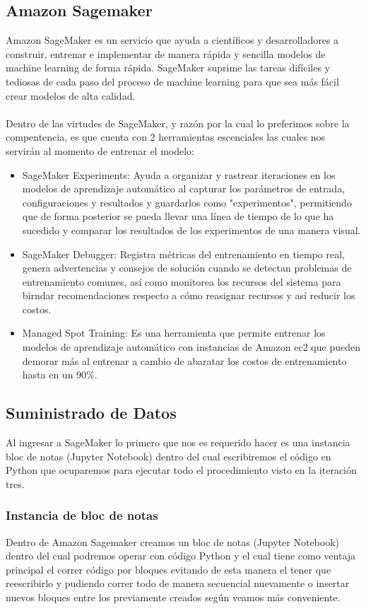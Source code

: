 \documentclass[12pt, a4paper, titlepage]{report}
\begin{document}
	\subsection{Amazon Sagemaker}
	Amazon SageMaker es un servicio que ayuda a científicos y desarrolladores a construir, entrenar e implementar de manera rápida y sencilla modelos de machine learning de forma rápida. SageMaker suprime las tareas difíciles y tediosas de cada paso del proceso de machine learning para que sea más fácil crear modelos de alta calidad.\\\\
	Dentro de las virtudes de SageMaker, y razón por la cual lo preferimos sobre la compentencia, es que cuenta con 2 herramientas escenciales las cuales nos servirán al momento de entrenar el modelo:
	\begin{itemize}
	\item SageMaker Experiments: Ayuda a organizar y rastrear iteraciones en los modelos de aprendizaje automático al capturar los parámetros de entrada, configuraciones y resultados y guardarlos como "experimentos", permitiendo que de forma posterior se pueda llevar una línea de tiempo de lo que ha sucedido y comparar los resultados de los experimentos de una manera visual.
	\item SageMaker Debugger: Registra métricas del entrenamiento en tiempo real, genera advertencias y consejos de solución cuando se detectan problemas de entrenamiento comunes, así como monitorea los recursos del sistema para birndar recomendaciones respecto a cómo reasignar recursos y así reducir los costos.
	\item Managed Spot Training: Es una herramienta que permite entrenar los modelos de aprendizaje automático con instancias de Amazon \acrshort{ec2} que pueden demorar más al entrenar a cambio de abaratar los costos de entrenamiento hasta en un 90\%.
	\end{itemize}
	\newpage
	
	\subsection{Suministrado de Datos}
	Al ingresar a SageMaker lo primero que nos es requerido hacer es una instancia  bloc de notas (Jupyter Notebook) dentro del cual escribiremos el código en Python que ocuparemos para ejecutar todo el procedimiento visto en la iteración tres.
	
		\subsubsection*{Instancia de bloc de notas}
		Dentro de Amazon Sagemaker creamos un bloc de notas (Jupyter Notebook) dentro del cual podremos operar con código Python y el cual tiene como ventaja principal el correr código por bloques evitando de esta manera el tener que reescribirlo y pudiendo correr todo de manera secuencial nuevamente o insertar nuevos bloques entre los previamente creados según veamos más conveniente.\\
		
\end{document}

